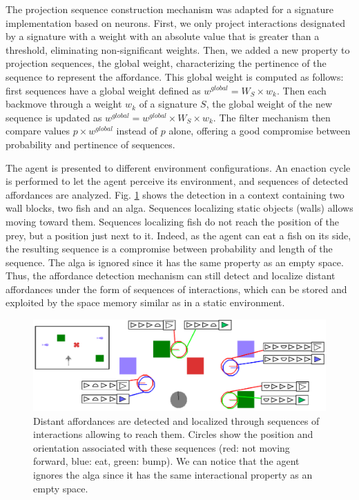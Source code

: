 \documentclass[conference]{IEEEtran}
\begin{document}
The projection sequence construction mechanism was adapted for a signature implementation based on neurons. First, we only project interactions designated by a signature with a weight with an absolute value that is greater than a threshold, eliminating non-significant weights. Then, we added a new property to projection sequences, the global weight, characterizing the pertinence of the sequence to represent the affordance. This global weight is computed as follows: first sequences have a global weight defined as $w^{global} = W_S \times w_k$. Then each backmove through a weight $w_k$ of a signature $S$, the global weight of the new sequence is updated as $w^{global}=w^{global} \times  W_S \times w_k$. The filter mechanism then compare values $p \times w^{global}$ instead of $p$ alone, offering a good compromise between probability and pertinence of sequences.


The agent is presented to different environment configurations. An enaction cycle is performed to let the agent perceive its environment, and sequences of detected affordances are analyzed.
Fig. \ref{fig:detect} shows the detection in a context containing two wall blocks, two fish and an alga. Sequences localizing static objects (walls) allows moving toward them. 
Sequences localizing fish do not reach the position of the prey, but a position just next to it. 
Indeed, as the agent can eat a fish on its side, the resulting sequence is a compromise between probability and length of the sequence. 
The alga is ignored since it has the same property as an empty space. 
Thus, the affordance detection mechanism can still detect and localize distant affordances under the form of sequences of interactions, which can be stored and exploited by the space memory similar as in a static environment.



\begin{figure}[htbp]
\centerline{\includegraphics[scale=0.4]{img/detection.pdf}}
\caption{Distant affordances are detected and localized through sequences of interactions allowing to reach them. Circles show the position and orientation associated with these sequences (red: not moving forward, blue: eat, green: bump). 
We can notice that the agent ignores the alga since it has the same interactional property as an empty space.}
\label{fig:detect}
\end{figure}
\end{document}
